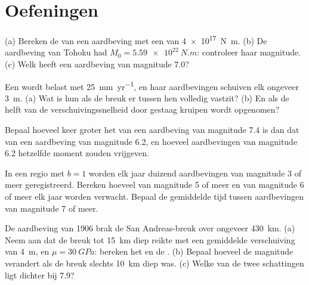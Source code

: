 \section{Oefeningen}

\begin{exercise}[$\star$]\label{exo:b1:earthquake-source:1}
(a) Bereken de  van een aardbeving met een  van \qty{4e17}{N.m}. (b) De aardbeving van Tohoku had $M_0 = \qty{5.59e22}{N.m}$: controleer haar magnitude. (c) Welk  heeft een aardbeving van magnitude 7.0?
\end{exercise}

\begin{exercise}[$\star$]\label{exo:b1:earthquake-source:2}
Een  wordt belast met \qty{25}{mm.yr^{-1}}, en haar aardbevingen schuiven elk ongeveer \qty{3}{m}. (a) Wat is hun  als de breuk er tussen hen volledig vastzit? (b) En als de helft van de verschuivingssnelheid door gestaag kruipen wordt opgenomen?
\end{exercise}

\begin{exercise}[$\star$]\label{exo:b1:earthquake-source:3}
Bepaal hoeveel keer groter het  van een aardbeving van magnitude 7.4 is dan dat van een aardbeving van magnitude 6.2, en hoeveel aardbevingen van magnitude 6.2 hetzelfde moment zouden vrijgeven.
\end{exercise}

\begin{exercise}[$\star$]\label{exo:b1:earthquake-source:4}
In een regio met $b = 1$ worden elk jaar duizend aardbevingen van magnitude 3 of meer geregistreerd. Bereken hoeveel van magnitude 5 of meer en van magnitude 6 of meer elk jaar worden verwacht. Bepaal de gemiddelde tijd tussen aardbevingen van magnitude 7 of meer.
\end{exercise}

\begin{exercise}[$\star\star$]\label{exo:b1:earthquake-source:5}
De aardbeving van 1906 brak de San Andreas-breuk over ongeveer \qty{430}{km}. (a) Neem aan dat de breuk tot \qty{15}{km} diep reikte met een gemiddelde verschuiving van \qty{4}{m}, en $\mu = \qty{30}{GPa}$: bereken het  en de . (b) Bepaal hoeveel de magnitude verandert als de breuk slechts \qty{10}{km} diep was. (c) Welke van de twee schattingen ligt dichter bij 7.9?
\end{exercise}

